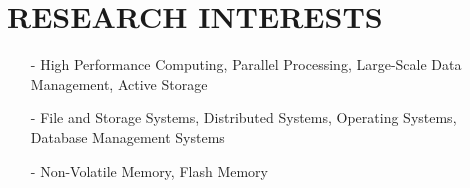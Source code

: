 \section{RESEARCH INTERESTS}
\begin{itemize}[leftmargin=*]
\setlength\itemsep{-0.02in}
\item[-] High Performance Computing, Parallel Processing, Large-Scale Data Management,
Active Storage
\item[-] File and Storage Systems, Distributed Systems, Operating Systems,
Database Management Systems
\item[-] Non-Volatile Memory, Flash Memory
\end{itemize}

